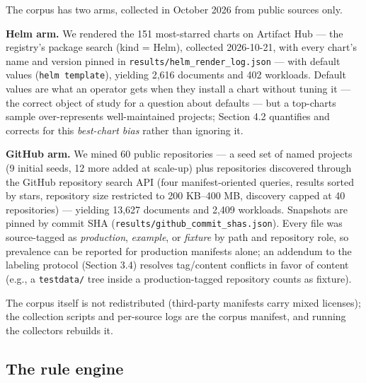\documentclass[pdflatex,sn-basic]{sn-jnl}
\begin{document}
The corpus has two arms, collected in October 2026 from public sources
only.

\textbf{Helm arm.} We rendered the 151 most-starred charts on Artifact
Hub --- the registry's package search (kind = Helm), collected
2026-10-21, with every chart's name and version pinned in
\texttt{results/helm\_render\_log.json} --- with default values
(\texttt{helm\ template}), yielding 2,616 documents and 402 workloads. Default values are what an operator gets
when they install a chart without tuning it --- the correct object of
study for a question about defaults --- but a top-charts sample
over-represents well-maintained projects; Section 4.2 quantifies and
corrects for this \emph{best-chart bias} rather than ignoring it.

\textbf{GitHub arm.} We mined 60 public repositories --- a seed set of
named projects (9 initial seeds, 12 more added at scale-up) plus
repositories discovered through the GitHub repository search API (four
manifest-oriented queries, results sorted by stars, repository size
restricted to 200 KB--400 MB, discovery capped at 40 repositories) ---
yielding 13,627 documents and 2,409 workloads. Snapshots are pinned by commit SHA
(\texttt{results/github\_commit\_shas.json}). Every file was
source-tagged as \emph{production}, \emph{example}, or \emph{fixture} by
path and repository role, so prevalence can be reported for production
manifests alone; an addendum to the labeling protocol (Section 3.4)
resolves tag/content conflicts in favor of content (e.g., a
\texttt{testdata/} tree inside a production-tagged repository counts as
fixture).

The corpus itself is not redistributed (third-party manifests carry
mixed licenses); the collection scripts and per-source logs are the
corpus manifest, and running the collectors rebuilds it.

\hypertarget{the-rule-engine}{%
\subsection{The rule engine}\label{the-rule-engine}}
\end{document}
